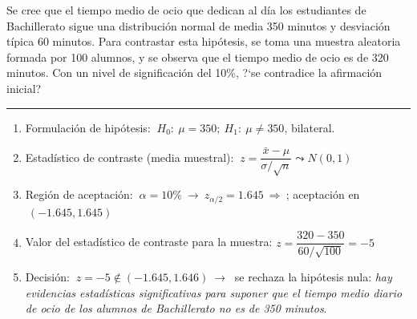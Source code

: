 \vspace{4mm}
\begin{example}

	Se cree que el tiempo medio de ocio que dedican al día los estudiantes de Bachillerato sigue una distribución normal de media 350 minutos y desviación típica 60 minutos. Para contrastar esta hipótesis, se toma una muestra aleatoria formada por 100 alumnos, y se observa que el tiempo medio de ocio es de 320 minutos. Con un nivel de significación del 10\%, ?`se contradice la afirmación inicial? 
	
	\rule{150pt}{0.1pt}
	
\begin{enumerate}[1.- ]
\item Formulación de hipótesis: $\ H_0:\ \mu=350;\ H_1:\ \mu\neq 350$, bilateral.
\item Estadístico de contraste (media muestral): $\ z=\dfrac{\bar x - \mu}{\sigma/\sqrt{n}} \leadsto N(0,1)$
\item Región de aceptación: $\ \alpha=10\% \ \to \ z_{\alpha/2}=1.645 \ \Rightarrow \ $; aceptación en $\ (-1.645,1.645)$
\item Valor del estadístico de contraste para la muestra: $z=\dfrac{320-350}{60/\sqrt{100}}=-5$
\item Decisión: $\ z=-5 \notin (-1.645,1.646) \ \to \ $ se rechaza la hipótesis nula: \emph{ hay evidencias estadísticas significativas para suponer que el tiempo medio diario de ocio de los alumnos de Bachillerato no es de 350 minutos}.	 
\end{enumerate}
\end{example}

